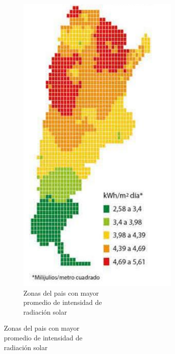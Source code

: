 \begin{figure}[H]
\centering
\begin{subfigure}{0.4\textwidth}
\includegraphics[width=1\linewidth]{ambiente/Screenshot_1.png} 
\caption{Zonas del pais con mayor \\promedio de intensidad de \\radiación solar}

\end{subfigure}
\end{figure}
